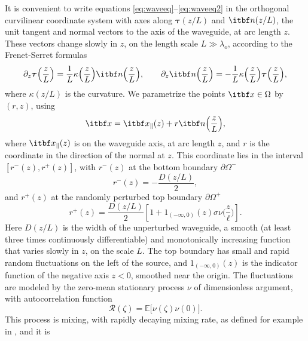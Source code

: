 \documentclass[final]{siamltex}
\begin{document}
It is convenient to write equations
\eqref{eq:waveeq}--\eqref{eq:waveeq2} in the orthogonal curvilinear
coordinate system with axes along ${{\bm{\tau}}}(z/L)$ and ${{{\itbf n}}}(z/L)$, the
unit tangent and normal vectors to the axis of the waveguide, at arc
length $z$. These vectors change slowly in $z$, on the length scale $L
\gg {\lambda}_o$, according to the Frenet-Serret formulas
\begin{align}
\partial_z {{\bm{\tau}}}\Big(\frac{z}{L}\Big) = \frac{1}{L}
\kappa\Big(\frac{z}{L}\Big) {{{\itbf n}}}\Big(\frac{z}{L}\Big), \qquad
\partial_z {{{\itbf n}}}\Big(\frac{z}{L}\Big) = - \frac{1}{L} \kappa
\Big(\frac{z}{L}\Big) {{\bm{\tau}}}\Big(\frac{z}{L}\Big), \label{eq:fm3}
\end{align}
where $\kappa(z/L)$ is the curvature. We parametrize the 
points ${{{\itbf x}}} \in \Omega$ by $(r,z)$, using
\begin{equation}
{{{\itbf x}}} = {{{\itbf x}}}_{\parallel}(z) + r {{{\itbf n}}}\Big(\frac{z}{L}\Big),
\label{eq:fm4}
\end{equation}
where ${{{\itbf x}}}_{\parallel}(z)$ is on the waveguide axis, at arc length
$z$, and $r$ is the coordinate in the direction of the normal at
$z$. This coordinate lies in the interval $[r^-(z),r^+(z)]$, with
$r^-(z)$ at the bottom boundary $\partial \Omega^-$
\begin{equation}
r^-(z) = -\frac{D(z/L)}{2},
\label{eq:fm6p}
\end{equation}
and $r^+(z)$ at the randomly perturbed top boundary $\partial \Omega^+$
\begin{equation}
r^+(z)= \frac{D(z/L)}{2} \left[1 + 1_{(-\infty,0)}(z) \sigma \nu
  \Big(\frac{z}{\ell}\Big) \right].
\label{eq:fm6}
\end{equation}
Here $D(z/L)$ is the width of the unperturbed waveguide, a smooth (at least 
three times continuously differentiable) and monotonically increasing function that
varies slowly in $z$, on the scale $L$. The top boundary has small and
rapid random fluctuations on the left of the source, and $1_{(-\infty,0)}(z) $
is the indicator function of the negative axis $z < 0$, smoothed near
the origin.  The fluctuations are modeled by the zero-mean stationary
process $\nu$ of dimensionless argument, with autocorrelation function
\begin{equation}
{\mathcal{R}}(\zeta) = {\mathbb{E}}\big[ \nu(\zeta) \nu (0)\big].
\label{eq:autocorrel}
\end{equation}
This process is mixing, with rapidly decaying mixing rate, as defined
for example in \cite[section 2]{papanicolaou1974asymptotic}, and it is
\end{document}
